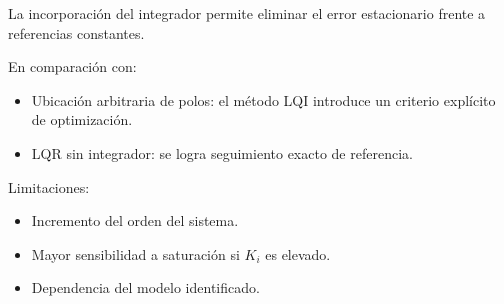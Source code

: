 La incorporación del integrador permite eliminar el error
estacionario frente a referencias constantes.

En comparación con:

\begin{itemize}
	\item Ubicación arbitraria de polos:
	el método LQI introduce un criterio explícito de optimización.
	\item LQR sin integrador:
	se logra seguimiento exacto de referencia.
\end{itemize}

Limitaciones:

\begin{itemize}
	\item Incremento del orden del sistema.
	\item Mayor sensibilidad a saturación si $K_i$ es elevado.
	\item Dependencia del modelo identificado.
\end{itemize}
